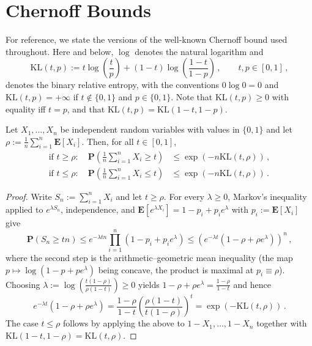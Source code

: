 \documentclass{article}
\newcommand{\lab}{\left[} %
\newcommand{\rab}{\right]} %
\newcommand{\ab}[1]{\lab #1 \rab} %
\newcommand{\abOf}[1]{\!\ab{#1}} %
\newcommand{\lb}{\left(} %
\newcommand{\rb}{\right)} %
\newcommand{\br}[1]{\lb #1 \rb} %
\newcommand{\brOf}[1]{\!\br{#1}} %
\renewcommand{\Pr}{\mathbf{P}} %
\newcommand{\PrOf}[1]{\Pr\brOf{#1}}
\newcommand{\E}{\mathbf{E}} %
\newcommand{\Eof}[1]{\E[#1]}
\newcommand{\EOf}[1]{\E\abOf{#1}}
\newcommand{\eqcm}{\,,} %
\newcommand{\eqfs}{\,.}
\newcommand{\kullback}{\mathrm{K\!L}} %
\begin{document}
%
%
%

\section{Chernoff Bounds}
%
For reference, we state the versions of the well-known Chernoff bound used
throughout. Here and below, $\log$ denotes the natural logarithm and
\begin{equation}\label{eq:kl}
    \kullback(t, p)
    := t \log\brOf{\frac{t}{p}} + (1-t) \log\brOf{\frac{1-t}{1-p}}
    \eqcm
    \qquad t, p \in [0,1]
    \eqcm
\end{equation}
denotes the binary relative entropy, with the conventions $0 \log 0 = 0$ and
$\kullback(t,p) = +\infty$ if $t \notin \{0,1\}$ and $p \in \{0,1\}$. Note that
$\kullback(t,p) \geq 0$ with equality iff $t = p$, and that
$\kullback(t,p) = \kullback(1-t,1-p)$.
%
\begin{proposition}\label{prp:chernoff:addi}
    Let $X_1, \dots, X_n$ be independent random variables with values in $\{0,1\}$
    and let $\rho := \frac1n \sum_{i=1}^n \EOf{X_i}$.
    Then, for all $t \in [0,1]$,
    \begin{align}
        \text{if $t \geq \rho$}\colon\quad
        \PrOf{\frac1n \sum_{i=1}^n X_i \geq t} &\leq \exp\brOf{-n \kullback(t, \rho)}
        \eqcm\\
        \text{if $t \leq \rho$}\colon\quad
        \PrOf{\frac1n \sum_{i=1}^n X_i \leq t} &\leq \exp\brOf{-n \kullback(t, \rho)}
        \eqfs
    \end{align}
\end{proposition}
%
\begin{proof}
    Write $S_n := \sum_{i=1}^n X_i$ and let $t \geq \rho$. For every $\lambda \geq 0$,
    Markov's inequality applied to $e^{\lambda S_n}$, independence, and
    $\EOf{e^{\lambda X_i}} = 1 - p_i + p_i e^{\lambda}$ with $p_i := \Eof{X_i}$ give
    \begin{equation}
        \PrOf{S_n \geq t n}
        \leq
        e^{-\lambda t n} \prod_{i=1}^n \br{1 - p_i + p_i e^{\lambda}}
        \leq
        \brOf{e^{-\lambda t} \br{1 - \rho + \rho e^{\lambda}}}^n
        \eqcm
    \end{equation}
    where the second step is the arithmetic--geometric mean inequality (the map
    $p \mapsto \log(1-p+pe^{\lambda})$ being concave, the product is maximal at
    $p_i \equiv \rho$). Choosing
    $\lambda := \log\brOf{\frac{t(1-\rho)}{\rho(1-t)}} \geq 0$ yields
    $1 - \rho + \rho e^{\lambda} = \frac{1-\rho}{1-t}$ and hence
    \begin{equation}
        e^{-\lambda t} \br{1 - \rho + \rho e^{\lambda}}
        =
        \frac{1-\rho}{1-t} \brOf{\frac{\rho(1-t)}{t(1-\rho)}}^{t}
        =
        \exp\brOf{-\kullback(t,\rho)}
        \eqfs
    \end{equation}
    The case $t \leq \rho$ follows by applying the above to $1 - X_1, \dots, 1-X_n$
    together with $\kullback(1-t,1-\rho) = \kullback(t,\rho)$.
\end{proof}
\end{document}
